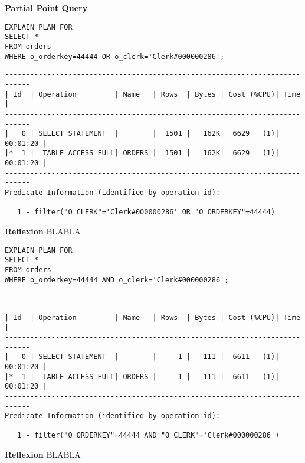 \documentclass[10pt]{article}
\begin{document}
\textbf{Partial Point Query}
\begin{lstlisting}[style=sql]
EXPLAIN PLAN FOR
SELECT *
FROM orders
WHERE o_orderkey=44444 OR o_clerk='Clerk#000000286';
\end{lstlisting}
\begin{lstlisting}[style=queryexecutionplan]
----------------------------------------------------------------------------
| Id  | Operation         | Name   | Rows  | Bytes | Cost (%CPU)| Time     |
----------------------------------------------------------------------------
|   0 | SELECT STATEMENT  |        |  1501 |   162K|  6629   (1)| 00:01:20 |
|*  1 |  TABLE ACCESS FULL| ORDERS |  1501 |   162K|  6629   (1)| 00:01:20 |
----------------------------------------------------------------------------
Predicate Information (identified by operation id):
---------------------------------------------------
   1 - filter("O_CLERK"='Clerk#000000286' OR "O_ORDERKEY"=44444)
\end{lstlisting}
\textbf{Reflexion} \newline
BLABLA

\begin{lstlisting}[style=sql]
EXPLAIN PLAN FOR
SELECT *
FROM orders
WHERE o_orderkey=44444 AND o_clerk='Clerk#000000286';
\end{lstlisting}
\begin{lstlisting}[style=queryexecutionplan]
----------------------------------------------------------------------------
| Id  | Operation         | Name   | Rows  | Bytes | Cost (%CPU)| Time     |
----------------------------------------------------------------------------
|   0 | SELECT STATEMENT  |        |     1 |   111 |  6611   (1)| 00:01:20 |
|*  1 |  TABLE ACCESS FULL| ORDERS |     1 |   111 |  6611   (1)| 00:01:20 |
----------------------------------------------------------------------------
Predicate Information (identified by operation id):
---------------------------------------------------
   1 - filter("O_ORDERKEY"=44444 AND "O_CLERK"='Clerk#000000286')
\end{lstlisting}
\textbf{Reflexion} \newline
BLABLA
\end{document}
